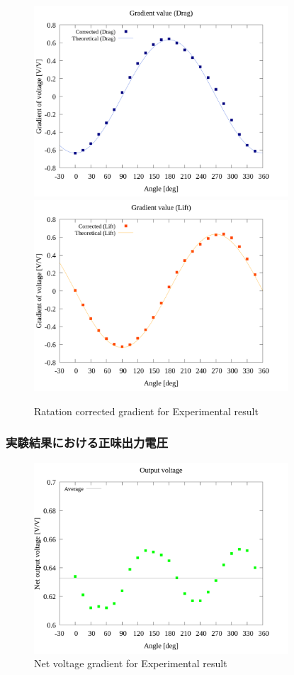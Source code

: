 \begin{figure}[htbp]
  \begin{center}
    \includegraphics[width=95mm]{../../02_workspace/result/2-ex/plot/21/21-4_corrected_angle_drag.png}
    \includegraphics[width=95mm]{../../02_workspace/result/2-ex/plot/21/21-4_corrected_angle_lift.png}
  \end{center}
  \caption{Ratation corrected gradient for Experimental result}
\end{figure}

\newpage

\subsubsection{実験結果における正味出力電圧}

\begin{figure}[htbp]
  \centering
  \includegraphics[width=95mm]{../../02_workspace/result/2-ex/plot/09/09_summary-outputvoltage-net.png}
  \caption{Net voltage gradient for Experimental result}
\end{figure}

